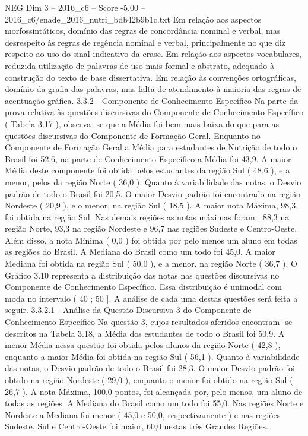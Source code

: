 \begin{textsample}{NEG Dim 3 – 2016\_c6 – Score -5.00 – 2016\_c6/enade\_2016\_nutri\_bdb42b9b1c.txt}
Em relação aos aspectos morfossintáticos, domínio das regras de concordância nominal e verbal, mas desrespeito às regras de regência nominal e verbal, principalmente no que diz respeito ao uso do sinal indicativo da crase.
Em relação aos aspectos vocabulares, reduzida utilização de palavras de uso mais formal e abstrato, adequado à construção do texto de base dissertativa.
Em relação às convenções ortográficas, domínio da grafia das palavras, mas falta de atendimento à maioria das regras de acentuação gráfica. 3.3.2 - Componente de Conhecimento Específico Na parte da prova relativa às questões discursivas do Componente de Conhecimento Específico ( Tabela 3.17 ), observa -se que a Média foi bem mais baixa do que para as questões discursivas do Componente de Formação Geral.
Enquanto no Componente de Formação Geral a Média para estudantes de Nutrição de todo o Brasil foi 52,6, na parte de Conhecimento Específico a Média foi 43,9.
A maior Média deste componente foi obtida pelos estudantes da região Sul ( 48,6 ), e a menor, pelos da região Norte ( 36,0 ).
Quanto à variabilidade das notas, o Desvio padrão de todo o Brasil foi 20,5.
O maior Desvio padrão foi encontrado na região Nordeste ( 20,9 ), e o menor, na região Sul ( 18,5 ).
A maior nota Máxima, 98,3, foi obtida na região Sul.
Nas demais regiões as notas máximas foram : 88,3 na região Norte, 93,3 na região Nordeste e 96,7 nas regiões Sudeste e Centro-Oeste.
Além disso, a nota Mínima ( 0,0 ) foi obtida por pelo menos um aluno em todas as regiões do Brasil.
A Mediana do Brasil como um todo foi 45,0.
A maior Mediana foi obtida na região Sul ( 50,0 ), e a menor, na região Norte ( 36,7 ).
O Gráfico 3.10 representa a distribuição das notas nas questões discursivas no Componente de Conhecimento Específico.
Essa distribuição é unimodal com moda no intervalo ( 40 ; 50 ].
A análise de cada uma destas questões será feita a seguir. 3.3.2.1 - Análise da Questão Discursiva 3 do Componente de Conhecimento Específico Na questão 3, cujos resultados aferidos encontram -se descritos na Tabela 3.18, a Média dos estudantes de todo o Brasil foi 50,9.
A menor Média nessa questão foi obtida pelos alunos da região Norte ( 42,8 ), enquanto a maior Média foi obtida na região Sul ( 56,1 ).
Quanto à variabilidade das notas, o Desvio padrão de todo o Brasil foi 28,3.
O maior Desvio padrão foi obtido na região Nordeste ( 29,0 ), enquanto o menor foi obtido na região Sul ( 26,7 ).
A nota Máxima, 100,0 pontos, foi alcançada por, pelo menos, um aluno de todas as regiões.
A Mediana do Brasil como um todo foi 55,0.
Nas regiões Norte e Nordeste a Mediana foi menor ( 45,0 e 50,0, respectivamente ) e nas regiões Sudeste, Sul e Centro-Oeste foi maior, 60,0 nestas três Grandes Regiões.

\end{textsample}
